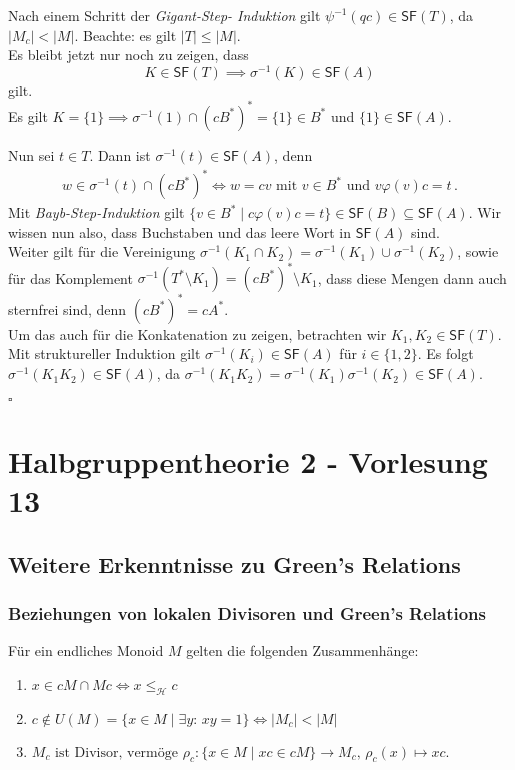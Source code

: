 \documentclass[12pt, german]{article}
\newcommand{\inv}{^{-1}}
\newcommand{\starfree}{\mathsf{SF}}
\newcommand{\lgreheq}{\leqslant_{\mathcal{H}}}
\newcommand{\aast}{A^{\ast}}
\newcommand{\bast}{B^{\ast}}
\newcommand{\bewiesen}{
	
	\begin{flushright}
		$\square$  \\
\end{flushright}}
\begin{document}
	Nach einem Schritt der \textit{Gigant-Step- Induktion} gilt $\psi\inv(qc) \in \starfree(T)$, da $|M_c| < |M|$. Beachte: es gilt $|T| \leq |M|$.\\
	Es bleibt jetzt nur noch zu zeigen, dass 
	$$ K \in \starfree(T) \implies \sigma\inv(K) \in \starfree(A)$$
	gilt.\\
	Es gilt $K = \{1\} \implies \sigma\inv(1) \cap (c\bast)^\ast = \{1\} \in \bast$ und $\{1\} \in \starfree(A)$.
	\newline
	
	Nun sei $t \in T$. Dann ist $\sigma\inv(t) \in \starfree(A)$, denn 
	\begin{align*}
		w \in \sigma\inv(t) \cap(c\bast)^\ast \iff w = cv \text{ mit } v \in \bast \text{ und } v \varphi(v)c = t\, .
	\end{align*} 
	Mit \textit{Bayb-Step-Induktion} gilt $\{v \in B^\ast \mid c \varphi(v)c = t\} \in \starfree(B) \subseteq \starfree(A)$. 
	Wir wissen nun also, dass Buchstaben und das leere Wort in $\starfree(A)$ sind.\\
			
	Weiter gilt für die Vereinigung $\sigma\inv(K_1 \cap K_2) = \sigma\inv(K_1) \cup \sigma\inv(K_2)$, sowie für das Komplement $\sigma\inv(T^\ast \setminus K_1) = (c\bast)^\ast \setminus K_1$, dass diese Mengen dann auch sternfrei sind, denn $(c\bast)^\ast = c \aast$.\\
	Um das auch für die Konkatenation zu zeigen, betrachten wir $K_1, K_2 \in \starfree(T)$. Mit struktureller Induktion gilt $\sigma\inv (K_i) \in \starfree(A)$ für $i \in \{1,2\}$.
	Es folgt $\sigma\inv(K_1K_2) \in \starfree(A)$, da $\sigma\inv(K_1K_2) = \sigma\inv(K_1) \sigma\inv(K_2) \in \starfree(A)$. 
	\bewiesen
	
	\section{Halbgruppentheorie 2 - Vorlesung 13}
	\subsection{Weitere Erkenntnisse zu Green's Relations}
	
	\subsubsection{Beziehungen von lokalen Divisoren und Green's Relations}
	Für ein endliches Monoid $M$ gelten die  folgenden Zusammenhänge:
	\begin{enumerate}
		\item $x \in cM \cap Mc \iff x \lgreheq c$
		\item $c \notin U(M) = \{x \in M \mid \exists y:\, xy=1\} \iff |M_c| < |M|$
		\item  $M_c \text{ ist Divisor, vermöge } \rho_c: \{x \in M \mid xc \in cM\} \to  M_c,\, \rho_c(x) \mapsto xc$.
	\end{enumerate}
		
\end{document}
